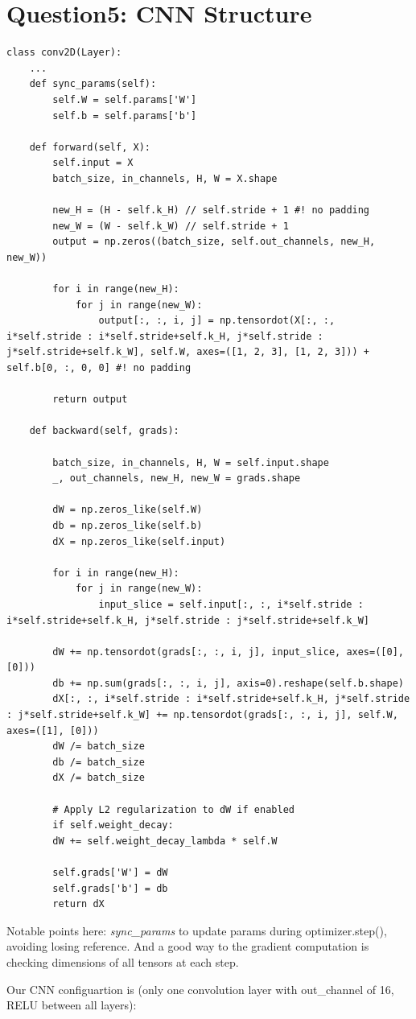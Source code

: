 \documentclass[]{article}
\begin{document}
\section{Question5: CNN Structure}
\begin{lstlisting}
class conv2D(Layer):
	...
	def sync_params(self):
		self.W = self.params['W']
		self.b = self.params['b']
		
	def forward(self, X):
		self.input = X
		batch_size, in_channels, H, W = X.shape

		new_H = (H - self.k_H) // self.stride + 1 #! no padding
		new_W = (W - self.k_W) // self.stride + 1
		output = np.zeros((batch_size, self.out_channels, new_H, new_W))
		
		for i in range(new_H):
			for j in range(new_W):
				output[:, :, i, j] = np.tensordot(X[:, :, i*self.stride : i*self.stride+self.k_H, j*self.stride : j*self.stride+self.k_W], self.W, axes=([1, 2, 3], [1, 2, 3])) + self.b[0, :, 0, 0] #! no padding
		
		return output
	
	def backward(self, grads):
	
		batch_size, in_channels, H, W = self.input.shape
		_, out_channels, new_H, new_W = grads.shape
		
		dW = np.zeros_like(self.W)
		db = np.zeros_like(self.b)
		dX = np.zeros_like(self.input)
		
		for i in range(new_H):
			for j in range(new_W):
				input_slice = self.input[:, :, i*self.stride : i*self.stride+self.k_H, j*self.stride : j*self.stride+self.k_W]
			
		dW += np.tensordot(grads[:, :, i, j], input_slice, axes=([0], [0]))
		db += np.sum(grads[:, :, i, j], axis=0).reshape(self.b.shape)
		dX[:, :, i*self.stride : i*self.stride+self.k_H, j*self.stride : j*self.stride+self.k_W] += np.tensordot(grads[:, :, i, j], self.W, axes=([1], [0]))
		dW /= batch_size
		db /= batch_size
		dX /= batch_size
		
		# Apply L2 regularization to dW if enabled
		if self.weight_decay:
		dW += self.weight_decay_lambda * self.W
		
		self.grads['W'] = dW
		self.grads['b'] = db
		return dX
\end{lstlisting}

Notable points here: \textit{sync\_params} to update params during optimizer.step(), avoiding losing reference. And a good way to the gradient computation is checking dimensions of all tensors at each step.

Our CNN configuartion is (only one convolution layer with out\_channel of 16, RELU between all layers):
\end{document}
